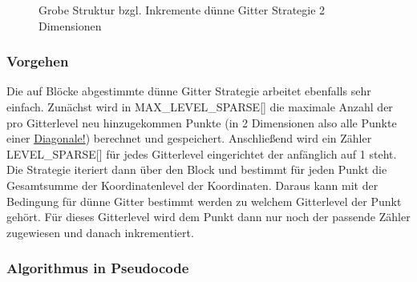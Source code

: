 \documentclass[a4paper,12pt]{llncs}
\numberwithin{equation}{section}
\begin{document}
\begin{figure}
	\caption{Grobe Struktur bzgl. Inkremente dünne Gitter Strategie 2 Dimensionen}
	\label{fig:sparseGrid01}
\end{figure}

\subsubsection{Vorgehen}

Die auf Blöcke abgestimmte dünne Gitter Strategie arbeitet ebenfalls sehr einfach. Zunächst wird in MAX\_LEVEL\_SPARSE[] die maximale Anzahl der pro Gitterlevel neu hinzugekommen Punkte (in 2 Dimensionen also alle Punkte einer \underline{Diagonale!}) berechnet und gespeichert. Anschließend wird ein Zähler LEVEL\_SPARSE[] für jedes Gitterlevel eingerichtet der anfänglich auf 1 steht. Die Strategie iteriert dann über den Block und bestimmt für jeden Punkt die Gesamtsumme der Koordinatenlevel der Koordinaten. Daraus kann mit der Bedingung für dünne Gitter bestimmt werden zu welchem Gitterlevel der Punkt gehört. Für dieses Gitterlevel wird dem Punkt dann nur noch der passende Zähler zugewiesen und danach inkrementiert.

\subsubsection{Algorithmus in Pseudocode}
\end{document}
